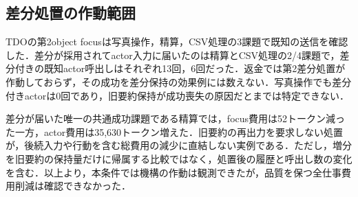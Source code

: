 \subsection{差分処置の作動範囲}
TDOの第2object focusは写真操作，精算，CSV処理の3課題で既知の送信を確認した．差分が採用されてactor入力に届いたのは精算とCSV処理の2/4課題で，差分付きの既知actor呼出しはそれぞれ13回，6回だった．返金では第2差分処置が作動しておらず，その成功を差分保持の効果例には数えない．写真操作でも差分付きactorは0回であり，旧要約保持が成功喪失の原因だとまでは特定できない．

差分が届いた唯一の共通成功課題である精算では，focus費用は52トークン減った一方，actor費用は35,630トークン増えた．旧要約の再出力を要求しない処置が，後続入力や行動を含む総費用の減少に直結しない実例である．ただし，増分を旧要約の保持量だけに帰属する比較ではなく，処置後の履歴と呼出し数の変化を含む．以上より，本条件では機構の作動は観測できたが，品質を保つ全仕事費用削減は確認できなかった．
